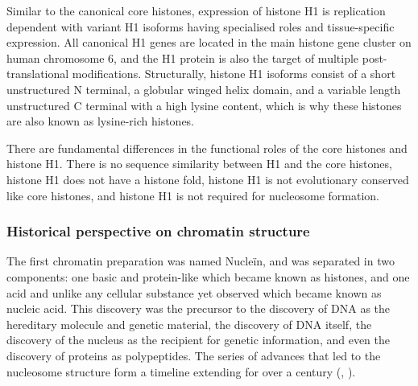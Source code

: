       Similar to the canonical core histones, expression of histone H1 is
      replication dependent with variant H1 isoforms having specialised
      roles and tissue-specific expression.  All canonical H1 genes
      are located in the main histone gene cluster on human
      chromosome 6, and the H1 protein
      is also the target of multiple post-translational modifications.
      Structurally, histone H1 isoforms consist of a short
      unstructured N terminal, a globular winged helix domain,
      and a variable length unstructured C terminal with a high lysine
      content, which is why these histones are also known as
      lysine-rich histones.

      There are fundamental differences in the functional roles of
      the core histones and histone H1.
      There is no sequence similarity between H1 and the core histones,
      histone H1 does not have a histone fold,
      histone H1 is not evolutionary conserved like core histones,
      and histone H1 is not required for nucleosome formation.

    \subsubsection{Historical perspective on chromatin structure}

      The first chromatin preparation \citep{kossel1884-histones}
      was named Nucleïn, and was
      separated in two components: one basic and protein-like which
      became known as histones, and one acid and unlike any cellular
      substance yet observed which became known as nucleic acid.
      This discovery was the precursor to the discovery of DNA as the hereditary
      molecule and genetic material, the discovery of DNA itself,
      the discovery of the nucleus as the recipient for genetic
      information, and even the discovery of proteins as polypeptides.
      The series of advances that led to the nucleosome
      structure form a timeline extending for over a century
      (,
      \cite{vanHolde-chapter1}).


